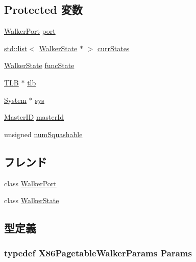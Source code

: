 \subsection*{Protected 変数}
\begin{DoxyCompactItemize}
\item 
\hyperlink{classX86ISA_1_1Walker_1_1WalkerPort}{WalkerPort} \hyperlink{classX86ISA_1_1Walker_a5934d4dbd0362d5d5d65c63ff6f247b0}{port}
\item 
\hyperlink{classstd_1_1list}{std::list}$<$ \hyperlink{classX86ISA_1_1Walker_1_1WalkerState}{WalkerState} $\ast$ $>$ \hyperlink{classX86ISA_1_1Walker_a5d2384e533dcdc7ac9570b89d6f39807}{currStates}
\item 
\hyperlink{classX86ISA_1_1Walker_1_1WalkerState}{WalkerState} \hyperlink{classX86ISA_1_1Walker_a5d3b5c10c016916fae2a38d5affcb907}{funcState}
\item 
\hyperlink{classX86ISA_1_1TLB}{TLB} $\ast$ \hyperlink{classX86ISA_1_1Walker_a9f0e11329a702fd34819769c899e4bd3}{tlb}
\item 
\hyperlink{classSystem}{System} $\ast$ \hyperlink{classX86ISA_1_1Walker_a8ae37465ba84acfef6af3e9b9e6dbbd5}{sys}
\item 
\hyperlink{request_8hh_ac366b729262fd8e7cbd3283da6f775cf}{MasterID} \hyperlink{classX86ISA_1_1Walker_a96ec6a422ac492d05f8b3edc5b58532b}{masterId}
\item 
unsigned \hyperlink{classX86ISA_1_1Walker_acd34c708c5a97f4ce631bb3b00404045}{numSquashable}
\end{DoxyCompactItemize}
\subsection*{フレンド}
\begin{DoxyCompactItemize}
\item 
class \hyperlink{classX86ISA_1_1Walker_a707eeb53fafd90cd7776b08a7acf6214}{WalkerPort}
\item 
class \hyperlink{classX86ISA_1_1Walker_ade52153fce1d8cac346d2287dc441289}{WalkerState}
\end{DoxyCompactItemize}


\subsection{型定義}
\hypertarget{classX86ISA_1_1Walker_a55ceaa41cdace6176b677cc22eb01bf6}{
\subsubsection[{Params}]{\setlength{\rightskip}{0pt plus 5cm}typedef X86PagetableWalkerParams {\bf Params}}}
\label{classX86ISA_1_1Walker_a55ceaa41cdace6176b677cc22eb01bf6}


